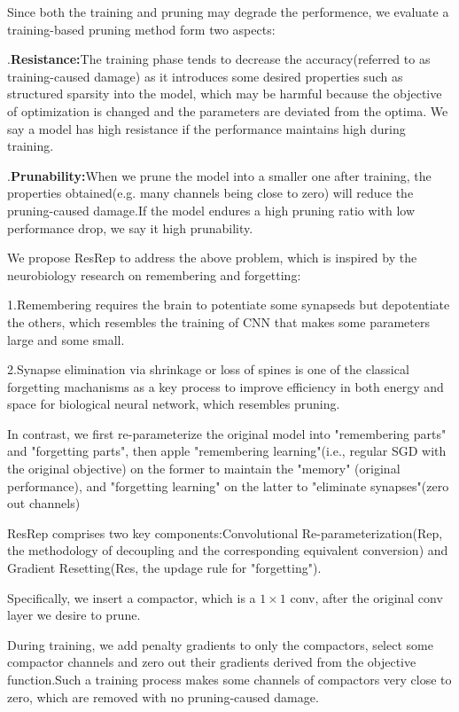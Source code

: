\documentclass[11pt]{article}
\begin{document}
Since both the training and pruning may degrade the performence, we evaluate a training-based pruning method form two aspects:

.\textbf{Resistance:}The training phase tends to decrease the accuracy(referred to as training-caused damage) as it introduces some desired properties such as structured sparsity into the model, which may be harmful because the objective of optimization is changed and the parameters are deviated from the optima. We say a model has high resistance if the performance maintains high during training.

.\textbf{Prunability:}When we prune the model into a smaller one after training, the properties obtained(e.g. many channels being close to zero) will reduce the pruning-caused damage.If the model endures a high pruning ratio with low performance drop, we say it high prunability.

We propose ResRep to address the above problem, which is inspired by the neurobiology research on remembering and forgetting: 

\noindent1.Remembering requires the brain to potentiate some synapseds but depotentiate the others, which resembles the training of CNN that makes some parameters large and some small.

\noindent2.Synapse elimination via shrinkage or loss of spines is one of the classical forgetting machanisms as a key process to improve efficiency in both energy and space for biological neural network, which resembles pruning.

In contrast, we first re-parameterize the original model into "remembering parts" and "forgetting parts", then apple "remembering learning"(i.e., regular SGD with the original objective) on the former to maintain the "memory" (original performance), and "forgetting learning" on the latter to "eliminate synapses"(zero out channels)

ResRep comprises two key components:Convolutional Re-parameterization(Rep, the methodology of decoupling and the corresponding equivalent conversion) and Gradient Resetting(Res, the updage rule for "forgetting").

Specifically, we insert a compactor, which is a $1\times 1$ conv, after the original conv layer we desire to prune.

During training, we add penalty gradients to only the compactors, select some compactor channels and zero out their gradients derived from the objective function.Such a training process makes some channels of compactors very close to zero, which are removed with no pruning-caused damage.
\end{document}
